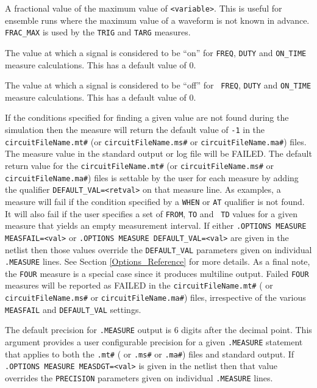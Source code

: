 \begin{Command}
\begin{Arguments}

A fractional value of the maximum value of \texttt{<variable>}.  This
is useful for ensemble runs where the maximum value of a waveform is
not known in advance.  {\tt FRAC\_MAX} is used by the {\tt TRIG} and
{\tt TARG} measures.


The value at which a signal is considered to be ``on'' for {\tt FREQ},
{\tt DUTY} and {\tt ON\_TIME} measure calculations.  This has a
default value of 0.


The value at which a signal is considered to be ``off'' for {\tt
FREQ}, {\tt DUTY} and {\tt ON\_TIME} measure calculations.  This has a
default value of 0.


If the conditions specified for finding a given value are not found
during the simulation then the measure will return the default value
of {\tt -1} in the \texttt{circuitFileName.mt\#}
(or \texttt{circuitFileName.ms\#} or \texttt{circuitFileName.ma\#})
files.  The measure value in the standard output or log file will be
FAILED.  The default return value for
the \texttt{circuitFileName.mt\#} (or \texttt{circuitFileName.ms\#}
or \texttt{circuitFileName.ma\#}) files is settable by the user for
each measure by adding the qualifier {\tt DEFAULT\_VAL=<retval>} on
that measure line.  As examples, a measure will fail if the condition
specified by a {\tt WHEN} or {\tt AT} qualifier is not found.  It will
also fail if the user specifies a set of {\tt FROM}, {\tt TO} and {\tt
TD} values for a given measure that yields an empty measurement
interval.  If either \texttt{.OPTIONS MEASURE MEASFAIL=<val>}
or \texttt{.OPTIONS MEASURE DEFAULT\_VAL=<val>} are given in the
netlist then those values override the \texttt{DEFAULT\_VAL}
parameters given on individual \texttt{.MEASURE} lines.  See Section
\ref{Options_Reference} for more details.  As a final note, the \texttt{FOUR}
measure is a special case since it produces multiline output.  Failed
\texttt{FOUR} measures will be reported as FAILED in the
\texttt{circuitFileName.mt\#} ( or \texttt{circuitFileName.ms\#} or
\texttt{circuitFileName.ma\#}) files, irrespective of the various
\texttt{MEASFAIL} and \texttt{DEFAULT\_VAL} settings.


The default precision for {\tt .MEASURE} output is 6 digits after the
decimal point.  This argument provides a user configurable precision
for a given {\tt .MEASURE} statement that applies to both
the \texttt{.mt\#} ( or \texttt{.ms\#} or \texttt{.ma\#}) files and
standard output.  If \texttt{.OPTIONS MEASURE MEASDGT=<val>} is given
in the netlist then that value overrides the \texttt{PRECISION}
parameters given on individual \texttt{.MEASURE} lines.


\end{Arguments}
\end{Command}
